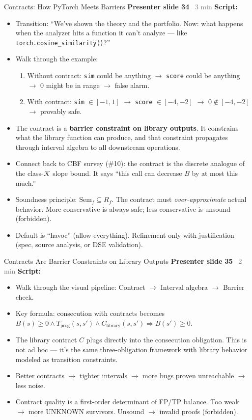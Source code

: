 \documentclass[aspectratio=169]{beamer}
\newcommand{\syncline}[2]{\textbf{#1} \hfill \textcolor{gray}{#2}}
\begin{document}
\begin{frame}{Contracts: How PyTorch Meets Barriers}
\syncline{Presenter slide 34}{~3 min}
\textbf{Script:}
\begin{itemize}
  \item Transition: ``We've shown the theory and the portfolio. Now: what happens when the analyzer hits a function it can't analyze --- like \texttt{torch.cosine\_similarity()}?''
  \item Walk through the example:
  \begin{enumerate}
    \item Without contract: \texttt{sim} could be anything $\to$ \texttt{score} could be anything $\to$ $0$ might be in range $\to$ false alarm.
    \item With contract: \texttt{sim} $\in [-1,1]$ $\to$ \texttt{score} $\in [-4,-2]$ $\to$ $0 \notin [-4,-2]$ $\to$ provably safe.
  \end{enumerate}
  \item The contract is a \textbf{barrier constraint on library outputs}. It constrains what the library function can produce, and that constraint propagates through interval algebra to all downstream operations.
  \item Connect back to CBF survey (\#10): the contract is the discrete analogue of the class-$\mathcal{K}$ slope bound. It says ``this call can decrease $B$ by at most this much.''
  \item Soundness principle: $\text{Sem}_f \subseteq R_f$. The contract must \emph{over-approximate} actual behavior. More conservative is always safe; less conservative is unsound (forbidden).
  \item Default is ``havoc'' (allow everything). Refinement only with justification (spec, source analysis, or DSE validation).
\end{itemize}
\end{frame}

\begin{frame}{Contracts Are Barrier Constraints on Library Outputs}
\syncline{Presenter slide 35}{~2 min}
\textbf{Script:}
\begin{itemize}
  \item Walk through the visual pipeline: Contract $\to$ Interval algebra $\to$ Barrier check.
  \item Key formula: consecution with contracts becomes $B(s) \ge 0 \wedge T_\text{prog}(s,s') \wedge C_\text{library}(s,s') \Rightarrow B(s') \ge 0$.
  \item The library contract $C$ plugs directly into the consecution obligation. This is not ad hoc --- it's the same three-obligation framework with library behavior modeled as transition constraints.
  \item Better contracts $\to$ tighter intervals $\to$ more bugs proven unreachable $\to$ less noise.
  \item Contract quality is a first-order determinant of FP/TP balance. Too weak $\to$ more UNKNOWN survivors. Unsound $\to$ invalid proofs (forbidden).
\end{itemize}
\end{frame}
\end{document}
